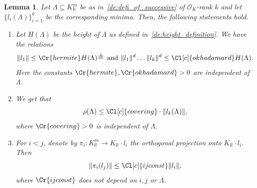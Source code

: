 \documentclass{amsart}
\newtheorem{lemma}[theorem]{Lemma}
\theoremstyle{definition}
\theoremstyle{remark}
\newcommand{\OK}{\mathcal{O}_K}
\newcommand{\KR}{K_\mathbb{R}}
\begin{document}
\begin{lemma}
    \label{le:props_of_minima}
    Let $\Lambda \subseteq \KR^{m}$ be as in~\cref{de:defi_of_successive} of $\OK$-rank $k$
    and let $\{l_{i}(\Lambda)\}_{i=1}^{k}$ be the corresponding minima.
    Then, the following statements hold.
    \begin{enumerate}
        \item \label{lepart:1}
            Let $H(\Lambda)$ be the height of $\Lambda$ as defined in~\cref{de:height_definition}. 
            We have the relations
            \begin{equation}
                \|l_1\| \leq \Cr{hermite} H(\Lambda)^{\frac{1}{d k}}
                \text{ and }
                \|l_1\|^{d} \dots  \|l_{k}\|^{d} \leq {\Cl[c]{okhadamard} } H(\Lambda).
            \end{equation}
            Here the constants $\Cr{hermite}, \Cr{okhadamard}>0$ are independent of $\Lambda$.
        \item 
            \label{lepart:2}
            We get that 
            \begin{equation}
                \rho(\Lambda) \leq \Cl[c]{covering} \cdot \|l_{k}(\Lambda)\|
                ,
            \end{equation}
            where $\Cr{covering}>0$ is independent of $\Lambda$.
        \item \label{lepart:3}
            For $i<j$, denote by $\pi_{i}:\KR^{m} \rightarrow K_\mathbb{R} \cdot l_i$ 
             the orthogonal projection onto $K_\mathbb{R} \cdot l_i$. Then
            \begin{equation}
                \| \pi_{i}(l_j)\| \leq \Cl[c]{ijconst}
                \|l_i\|,
            \end{equation}
            where $\Cr{ijconst}$ does not depend on $i,j$ or $\Lambda$.
    \end{enumerate}

\end{lemma}
\end{document}
